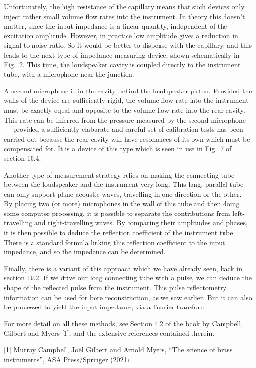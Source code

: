   Unfortunately, the high resistance of the capillary means that such devices 
  only inject rather small volume flow rates into the instrument. In theory 
  this doesn’t matter, since the input impedance is a linear quantity, 
  independent of the excitation amplitude. However, in practice low amplitude 
  gives a reduction in signal-to-noise ratio. So it would be better to dispense 
  with the capillary, and this leads to the next type of impedance-measuring 
  device, shown schematically in Fig.\ 2. This time, the loudspeaker cavity is 
  coupled directly to the instrument tube, with a microphone near the junction. 

  A second microphone is in the cavity behind the loudspeaker piston. Provided 
  the walls of the device are sufficiently rigid, the volume flow rate into the 
  instrument must be exactly equal and opposite to the volume flow rate into 
  the rear cavity. This rate can be inferred from the pressure measured by the 
  second microphone — provided a sufficiently elaborate and careful set of 
  calibration tests has been carried out because the rear cavity will have 
  resonances of its own which must be compensated for. It is a device of this 
  type which is seen in use in Fig.\ 7 of section 10.4. 

  Another type of measurement strategy relies on making the connecting tube 
  between the loudspeaker and the instrument very long. This long, parallel 
  tube can only support plane acoustic waves, travelling in one direction or 
  the other. By placing two (or more) microphones in the wall of this tube and 
  then doing some computer processing, it is possible to separate the 
  contributions from left-travelling and right-travelling waves. By comparing 
  their amplitudes and phases, it is then possible to deduce the reflection 
  coefficient of the instrument tube. There is a standard formula linking this 
  reflection coefficient to the input impedance, and so the impedance can be 
  determined. 

  Finally, there is a variant of this approach which we have already seen, back 
  in section 10.2. If we drive our long connecting tube with a pulse, we can 
  deduce the shape of the reflected pulse from the instrument. This pulse 
  reflectometry information can be used for bore reconstruction, as we saw 
  earlier. But it can also be processed to yield the input impedance, via a 
  Fourier transform. 

  For more detail on all these methods, see Section 4.2 of the book by 
  Campbell, Gilbert and Myers [1], and the extensive references contained 
  therein. 

  \sectionreferences{}[1] Murray Campbell, Joël Gilbert and Arnold Myers, “The 
  science of brass instruments”, ASA Press/Springer (2021) 